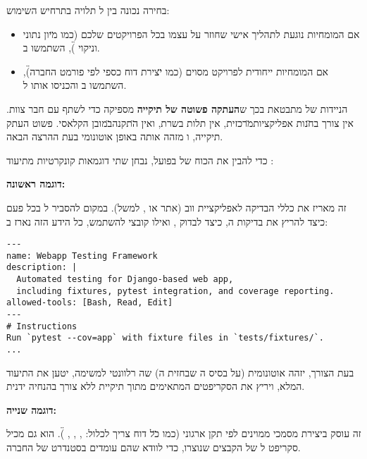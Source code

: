בחירה נכונה בין  ל תלויה בתרחיש השימוש:

\begin{itemize}
  \item אם המומחיות נוגעת לתהליך אישי שחוזר על עצמו בכל הפרויקטים שלכם (כמו \"מיון נתוני  וניקוי \"), השתמשו ב.
  \item אם המומחיות ייחודית לפרויקט מסוים (כמו \"יצירת דוח כספי לפי פורמט החברה\"), השתמשו ב והכניסו אותו ל.
\end{itemize}

הניידות של  מתבטאת בכך ש\textbf{העתקה פשוטה של תיקייה} מספיקה כדי לשתף  עם חבר צוות. אין צורך ב\"חנות אפליקציות\" מרכזית, אין תלות בשרת, ואין \"התקנה\" במובן הקלאסי. פשוט העתק תיקייה, ו מזהה אותה באופן אוטונומי בעת ההרצה הבאה.


כדי להבין את הכוח של  בפועל, נבחן שתי דוגמאות קונקרטיות מתיעוד \cite{anthropic2025skillsexamples}:

\textbf{דוגמה ראשונה: }

 זה מאריז את כללי הבדיקה לאפליקציית ווב (אתר  או , למשל). במקום להסביר ל בכל פעם כיצד להריץ את בדיקות ה, כיצד לבדוק , ואילו קובצי  להשתמש, כל הידע הזה נארז ב:

\begin{verbatim}
---
name: Webapp Testing Framework
description: |
  Automated testing for Django-based web app,
  including fixtures, pytest integration, and coverage reporting.
allowed-tools: [Bash, Read, Edit]
---
# Instructions
Run `pytest --cov=app` with fixture files in `tests/fixtures/`.
...
\end{verbatim}

בעת הצורך,  יזהה אוטונומית (על בסיס ה שבחזית ה) שה רלוונטי למשימה, יטען את התיעוד המלא, ויריץ את הסקריפטים המתאימים מתוך תיקיית  ללא צורך בהנחיה ידנית.

\textbf{דוגמה שנייה: }

 זה עוסק ביצירת מסמכי  ממוינים לפי תקן ארגוני (כמו \"כל דוח צריך לכלול: , , , \"). הוא גם מכיל סקריפט ל של הקבצים שנוצרו, כדי לוודא שהם עומדים בסטנדרט של החברה.

